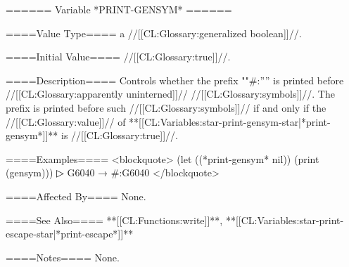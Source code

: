 ====== Variable *PRINT-GENSYM* ======

====Value Type====
a //[[CL:Glossary:generalized boolean]]//.

====Initial Value====
//[[CL:Glossary:true]]//.

====Description====
Controls whether the prefix ""#:'''' is printed before //[[CL:Glossary:apparently uninterned]]// //[[CL:Glossary:symbols]]//. The prefix is printed before such //[[CL:Glossary:symbols]]// if and only if the //[[CL:Glossary:value]]// of **[[CL:Variables:star-print-gensym-star|*print-gensym*]]** is //[[CL:Glossary:true]]//.

====Examples====
<blockquote> (let ((*print-gensym* nil)) (print (gensym)))
▷ G6040 → #:G6040 </blockquote>

====Affected By====
None.

====See Also====
**[[CL:Functions:write]]**, **[[CL:Variables:star-print-escape-star|*print-escape*]]**

====Notes====
None.


